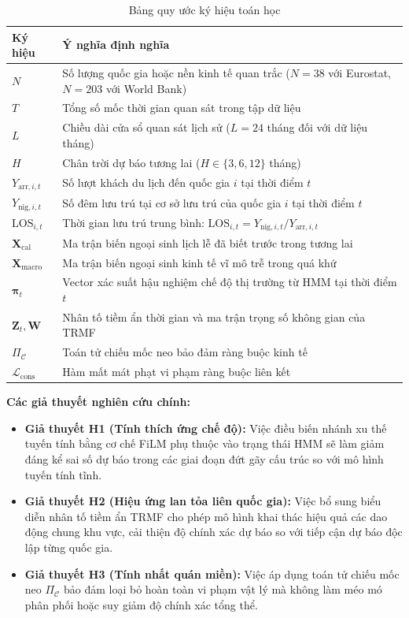 \begin{table}[H]
\centering
\caption{Bảng quy ước ký hiệu toán học}
\label{tab:math_notations}
\begin{tabular}{ll}
\toprule
\textbf{Ký hiệu} & \textbf{Ý nghĩa định nghĩa} \\
\midrule
$N$ & Số lượng quốc gia hoặc nền kinh tế quan trắc ($N=38$ với Eurostat, $N=203$ với World Bank) \\
$T$ & Tổng số mốc thời gian quan sát trong tập dữ liệu \\
$L$ & Chiều dài cửa sổ quan sát lịch sử ($L=24$ tháng đối với dữ liệu tháng) \\
$H$ & Chân trời dự báo tương lai ($H \in \{3, 6, 12\}$ tháng) \\
$Y_{\text{arr}, i, t}$ & Số lượt khách du lịch đến quốc gia $i$ tại thời điểm $t$ \\
$Y_{\text{nig}, i, t}$ & Số đêm lưu trú tại cơ sở lưu trú của quốc gia $i$ tại thời điểm $t$ \\
$\text{LOS}_{i, t}$ & Thời gian lưu trú trung bình: $\text{LOS}_{i, t} = Y_{\text{nig}, i, t} / Y_{\text{arr}, i, t}$ \\
$\mathbf{X}_{\text{cal}}$ & Ma trận biến ngoại sinh lịch lễ đã biết trước trong tương lai \\
$\mathbf{X}_{\text{macro}}$ & Ma trận biến ngoại sinh kinh tế vĩ mô trễ trong quá khứ \\
$\bm{\pi}_t$ & Vector xác suất hậu nghiệm chế độ thị trường từ HMM tại thời điểm $t$ \\
$\mathbf{Z}_t, \mathbf{W}$ & Nhân tố tiềm ẩn thời gian và ma trận trọng số không gian của TRMF \\
$\Pi_{\mathcal{C}}$ & Toán tử chiếu mốc neo bảo đảm ràng buộc kinh tế \\
$\mathcal{L}_{\text{cons}}$ & Hàm mất mát phạt vi phạm ràng buộc liên kết \\
\bottomrule
\end{tabular}
\end{table}

\noindent \textbf{Các giả thuyết nghiên cứu chính:}
\begin{itemize}
    \item \textbf{Giả thuyết H1 (Tính thích ứng chế độ):} Việc điều biến nhánh xu thế tuyến tính bằng cơ chế FiLM phụ thuộc vào trạng thái HMM sẽ làm giảm đáng kể sai số dự báo trong các giai đoạn đứt gãy cấu trúc so với mô hình tuyến tính tĩnh.
    \item \textbf{Giả thuyết H2 (Hiệu ứng lan tỏa liên quốc gia):} Việc bổ sung biểu diễn nhân tố tiềm ẩn TRMF cho phép mô hình khai thác hiệu quả các dao động chung khu vực, cải thiện độ chính xác dự báo so với tiếp cận dự báo độc lập từng quốc gia.
    \item \textbf{Giả thuyết H3 (Tính nhất quán miền):} Việc áp dụng toán tử chiếu mốc neo $\Pi_{\mathcal{C}}$ bảo đảm loại bỏ hoàn toàn vi phạm vật lý mà không làm méo mó phân phối hoặc suy giảm độ chính xác tổng thể.
\end{itemize}

